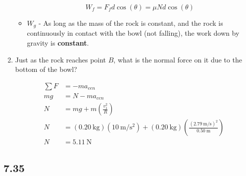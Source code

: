 \documentclass{article}
\begin{document}
\begin{enumerate}[label = \textbf{(\alph*)}]
\begin{itemize}
				\begin{equation*}
					W_f = F_fd\cos(\theta) = \mu Nd\cos(\theta)
				\end{equation*}
			\item $ W_g $ - As long as the mass of the rock is constant, and the rock is continuously in contact with the bowl (not falling), the work down by gravity is \textbf{constant}.
		\end{itemize}
	\item Just as the rock reaches point $ B $, what is the normal force on it due to the bottom of the bowl? \\
		\begin{align*}
			\sum F & = -ma_{cen} \\
			mg & = N - ma_{cen} \\
			N & = mg + m \left( \frac{v_1^2}{R} \right) \\
			N & = (\SI{0.20}{\kilogram})(\SI{10}{\meter \per \second \squared}) + (\SI{0.20}{\kilogram}) \left( \frac{(\SI{2.79}{\meter \per \second})^2}{\SI{0.50}{\meter}} \right) \\
			N & = \SI{5.11}{\newton}
		\end{align*}
\end{enumerate}

\subsection{7.35}
\end{document}
